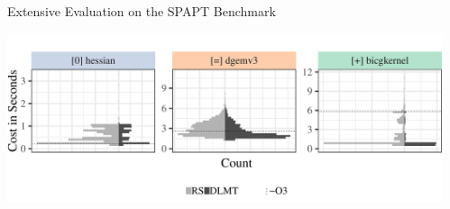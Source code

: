 \documentclass[11pt, compress, aspectratio=169, xcolor={table,usenames,dvipsnames}]{beamer}
\begin{document}
\begin{frame}
\begin{columns}
\begin{column}{0.89\columnwidth}
\begin{columns}
\begin{column}[t]{0.48\columnwidth}
\begin{block}{Extensive Evaluation on the SPAPT Benchmark}
\begin{center}
\begin{center}
\includegraphics[width=0.9\columnwidth]{../../../img/split_histograms.pdf}
\end{center}
\end{center}
\end{block}
\end{column}
\end{columns}
\end{column}
\begin{column}{0.09\columnwidth}
\end{column}
\end{columns}
\end{frame}
\end{document}
